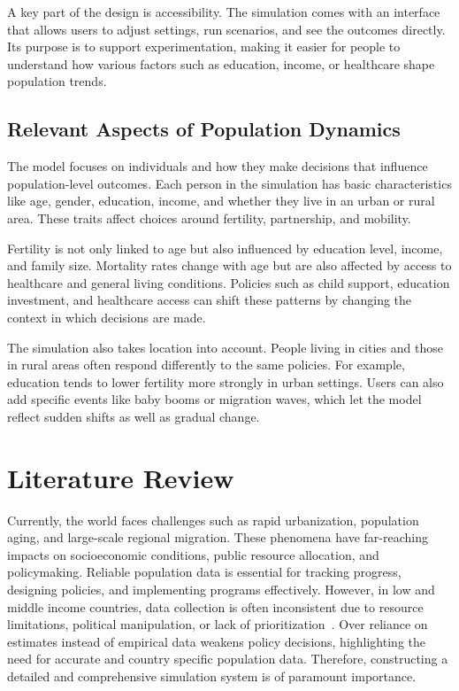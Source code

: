 \documentclass[12pt]{article}
\begin{document}
A key part of the design is accessibility. The simulation comes with an interface that allows users to adjust settings, run scenarios, and see the outcomes directly. Its purpose is to support experimentation, making it easier for people to understand how various factors such as education, income, or healthcare shape population trends.


\subsection{Relevant Aspects of Population Dynamics}

The model focuses on individuals and how they make decisions that influence population-level outcomes. Each person in the simulation has basic characteristics like age, gender, education, income, and whether they live in an urban or rural area. These traits affect choices around fertility, partnership, and mobility.

Fertility is not only linked to age but also influenced by education level, income, and family size. Mortality rates change with age but are also affected by access to healthcare and general living conditions. Policies such as child support, education investment, and healthcare access can shift these patterns by changing the context in which decisions are made.

The simulation also takes location into account. People living in cities and those in rural areas often respond differently to the same policies. For example, education tends to lower fertility more strongly in urban settings. Users can also add specific events like baby booms or migration waves, which let the model reflect sudden shifts as well as gradual change.



\newpage
\section{Literature Review}

Currently, the world faces challenges such as rapid urbanization, population aging, and large-scale regional migration. These phenomena have far-reaching impacts on socioeconomic conditions, public resource allocation, and policymaking. Reliable population data is essential for tracking progress, designing policies, and implementing programs effectively. However, in low and middle income countries, data collection is often inconsistent due to resource limitations, political manipulation, or lack of prioritization~\cite{ioannidis2017mass}. Over reliance on estimates instead of empirical data weakens policy decisions, highlighting the need for accurate and country specific population data. Therefore, constructing a detailed and comprehensive simulation system is of paramount importance.
\end{document}
